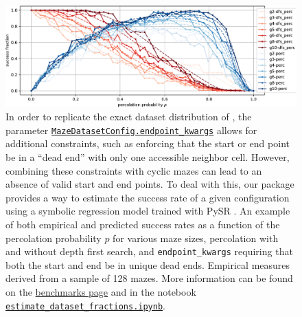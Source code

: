 \begin{figure}
	\centering
	\includegraphics[width=1\textwidth,height=\textheight]{figures/ep/ep_deadends_unique-crop.pdf}
	\caption{
		In order to replicate the exact dataset distribution of \cite{easy_to_hard}, the parameter 
		\href{https://understanding-search.github.io/maze-dataset/maze_dataset/dataset/maze_dataset_config.html\#MazeDatasetConfig.endpoint_kwargs}{\texttt{MazeDatasetConfig.endpoint\_kwargs}}
		allows for additional constraints, such as enforcing that the start or end point be in a ``dead end'' with only one accessible neighbor cell. However, combining these constraints with cyclic mazes can lead to an absence of valid start and end points. To deal with this, our package provides a way to estimate the success rate of a given configuration using a symbolic regression model trained with PySR \cite{pysr}.
		An example of both empirical and predicted success rates as a function of the percolation probability \(p\) for various maze sizes, percolation with and without depth first search, and \texttt{endpoint\_kwargs} requiring that both the start and end be in unique dead ends. Empirical measures derived from a sample of 128 mazes. More information can be found on the \href{https://understanding-search.github.io/maze-dataset/benchmarks/}{benchmarks page} and in the notebook 
		\href{https://understanding-search.github.io/maze-dataset/notebooks/estimate_dataset_fractions.html}{\texttt{estimate\_dataset\_fractions.ipynb}}.
	}
	\label{fig:sre}
\end{figure}